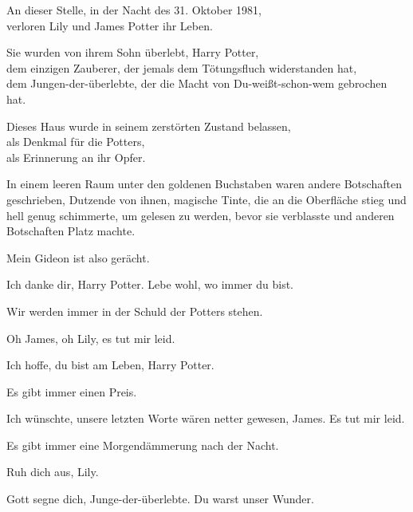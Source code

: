 \begin{center}
An dieser Stelle, in der Nacht des 31. Oktober 1981,\\
verloren Lily und James Potter ihr Leben.

Sie wurden von ihrem Sohn überlebt, Harry Potter,\\
dem einzigen Zauberer, der jemals dem Tötungsfluch widerstanden hat,\\
dem Jungen-der-überlebte, der die Macht von Du-weißt-schon-wem gebrochen hat.

Dieses Haus wurde in seinem zerstörten Zustand belassen,\\
als Denkmal für die Potters,\\
als Erinnerung an ihr Opfer.
\end{center}

In einem leeren Raum unter den goldenen Buchstaben waren andere Botschaften geschrieben, Dutzende von ihnen, magische Tinte, die an die Oberfläche stieg und hell genug schimmerte, um gelesen zu werden, bevor sie verblasste und anderen Botschaften Platz machte.

\begin{center}
Mein Gideon ist also gerächt.

Ich danke dir, Harry Potter. Lebe wohl, wo immer du bist.

Wir werden immer in der Schuld der Potters stehen.

Oh James, oh Lily, es tut mir leid.

Ich hoffe, du bist am Leben, Harry Potter.

Es gibt immer einen Preis.

Ich wünschte, unsere letzten Worte wären netter gewesen, James. Es tut mir leid.

Es gibt immer eine Morgendämmerung nach der Nacht.

Ruh dich aus, Lily.

Gott segne dich, Junge-der-überlebte. Du warst unser Wunder.
\end{center}

